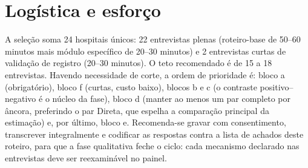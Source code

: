 \documentclass[12pt,a4paper]{article}
\begin{document}
\section{Logística e esforço}

A seleção soma 24 hospitais únicos: 22 entrevistas
plenas (roteiro-base de 50--60 minutos mais módulo específico de 20--30
minutos) e 2 entrevistas curtas de validação de registro (20--30
minutos). O teto recomendado é de 15 a 18 entrevistas. Havendo
necessidade de corte, a ordem de prioridade é: bloco a (obrigatório),
bloco f (curtas, custo baixo), blocos b e c (o contraste
positivo--negativo é o núcleo da fase), bloco d (manter ao menos um par
completo por âncora, preferindo o par Direta, que espelha a comparação
principal da estimação) e, por último, bloco e. Recomenda-se gravar com
consentimento, transcrever integralmente e codificar as respostas contra
a lista de achados deste roteiro, para que a fase qualitativa feche o
ciclo: cada mecanismo declarado nas entrevistas deve ser reexaminável no
painel.
\end{document}
